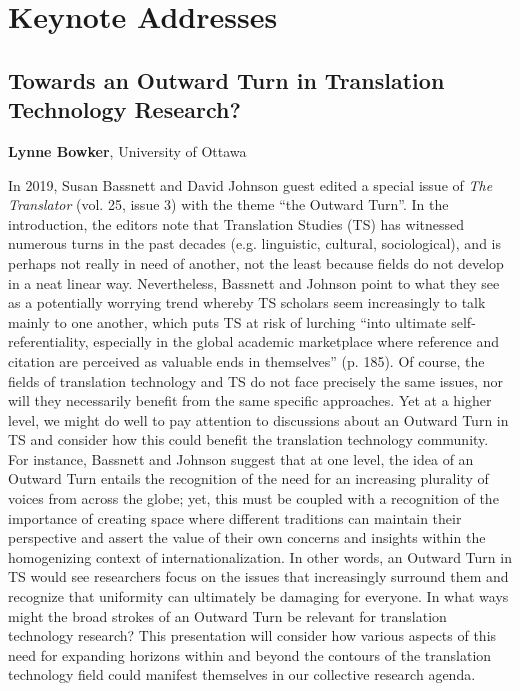 \documentclass[a4paper,11pt,twoside]{book}
\begin{document}
\mainmatter

\chapter*{Keynote Addresses}
\section*{Towards an Outward Turn in Translation Technology Research?}\label{invited}
\textbf{Lynne Bowker}, University of Ottawa
\vspace{0.5cm}

\begin{onehalfspacing}
\noindent
In 2019, Susan Bassnett and David Johnson guest edited a special issue of \emph{The Translator} (vol. 25, issue 3) with the theme “the Outward Turn”. In the introduction, the editors note that Translation Studies (TS) has witnessed numerous turns in the past decades (e.g. linguistic, cultural, sociological), and is perhaps not really in need of another, not the least because fields do not develop in a neat linear way. Nevertheless, Bassnett and Johnson point to what they see as a potentially worrying trend whereby TS scholars seem increasingly to talk mainly to one another, which puts TS at risk of lurching “into ultimate self-referentiality, especially in the global academic marketplace where reference and citation are perceived as valuable ends in themselves” (p. 185). Of course, the fields of translation technology and TS do not face precisely the same issues, nor will they necessarily benefit from the same specific approaches. Yet at a higher level, we might do well to pay attention to discussions about an Outward Turn in TS and consider how this could benefit the translation technology community. For instance, Bassnett and Johnson suggest that at one level, the idea of an Outward Turn entails the recognition of the need for an increasing plurality of voices from across the globe; yet, this must be coupled with a recognition of the importance of creating space where different traditions can maintain their perspective and assert the value of their own concerns and insights within the homogenizing context of internationalization. In other words, an Outward Turn in TS would see researchers focus on the issues that increasingly surround them and recognize that uniformity can ultimately be damaging for everyone. In what ways might the broad strokes of an Outward Turn be relevant for translation technology research? This presentation will consider how various aspects of this need for expanding horizons within and beyond the contours of the translation technology field could manifest themselves in our collective research agenda.\\
\end{onehalfspacing}
\vfill 
\clearpage
\end{document}
